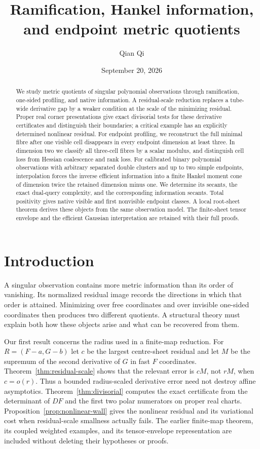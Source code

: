 \documentclass[11pt,reqno]{amsart}
\title[Ramification and metric quotients]{Ramification, Hankel information, and endpoint metric quotients}
\author{Qian Qi}
\date{September 20, 2026}
\numberwithin{equation}{section}
\theoremstyle{definition}
\theoremstyle{remark}
\begin{document}
\begin{abstract}
We study metric quotients of singular polynomial observations through ramification, one-sided profiling, and native information. A residual-scale reduction replaces a tube-wide derivative gap by a weaker condition at the scale of the minimizing residual. Proper real corner presentations give exact divisorial tests for these derivative certificates and distinguish their boundaries; a critical example has an explicitly determined nonlinear residual. For endpoint profiling, we reconstruct the full minimal fibre after one visible cell disappears in every endpoint dimension at least three. In dimension two we classify all three-cell fibres by a scalar modulus, and distinguish cell loss from Hessian coalescence and rank loss. For calibrated binary polynomial observations with arbitrary separated double clusters and up to two simple endpoints, interpolation forces the inverse efficient information into a finite Hankel moment cone of dimension twice the retained dimension minus one. We determine its secants, the exact dual-query complexity, and the corresponding information secants. Total positivity gives native visible and first nonvisible endpoint classes. A local root-sheet theorem derives these objects from the same observation model. The finite-sheet tensor envelope and the efficient Gaussian interpretation are retained with their full proofs.
\end{abstract}
\maketitle

\section{Introduction}
A singular observation contains more metric information than its order of
vanishing. Its normalized residual image records the directions in which
that order is attained. Minimizing over free coordinates and over invisible
one-sided coordinates then produces two different quotients. A structural
theory must explain both how these objects arise and what can be recovered
from them.

Our first result concerns the radius used in a finite-map reduction.
For $R=(F-a,G-b)$ let $c$ be the largest centre-sheet residual and let $M$
be the supremum of the second derivative of $G$ in fast $F$ coordinates.
Theorem~\ref{thm:residual-scale} shows that the relevant error is $cM$,
not $rM$, when $c=o(r)$. Thus a bounded radius-scaled derivative error
need not destroy affine asymptotics. Theorem~\ref{thm:divisorial} computes
the exact certificate from the determinant of $DF$ and the first two
polar numerators on proper real charts. Proposition~\ref{prop:nonlinear-wall}
gives the nonlinear residual and its variational cost when residual-scale
smallness actually fails. The earlier finite-map theorem, its coupled
weighted examples, and its tensor-envelope representation are included
without deleting their hypotheses or proofs.
\end{document}
